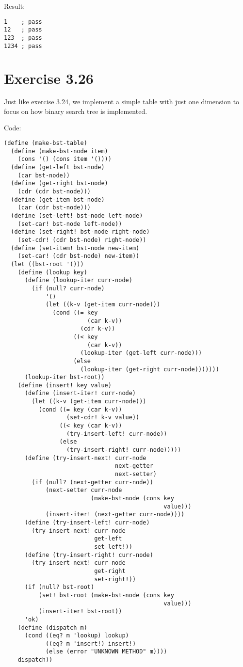 \documentclass[../main.tex]{subfiles}
\begin{document}
Result:

\begin{lstlisting}
1    ; pass
12   ; pass
123  ; pass
1234 ; pass
\end{lstlisting}

\section{Exercise 3.26}

Just like exercise 3.24, we implement a simple table
 with just one dimension to focus on how binary
 search tree is implemented.

Code:

\begin{lstlisting}
(define (make-bst-table)
  (define (make-bst-node item)
    (cons '() (cons item '())))
  (define (get-left bst-node)
    (car bst-node))
  (define (get-right bst-node)
    (cdr (cdr bst-node)))
  (define (get-item bst-node)
    (car (cdr bst-node)))
  (define (set-left! bst-node left-node)
    (set-car! bst-node left-node))
  (define (set-right! bst-node right-node)
    (set-cdr! (cdr bst-node) right-node))
  (define (set-item! bst-node new-item)
    (set-car! (cdr bst-node) new-item))
  (let ((bst-root '()))
    (define (lookup key)
      (define (lookup-iter curr-node)
        (if (null? curr-node)
            '()
            (let ((k-v (get-item curr-node)))
              (cond ((= key
                        (car k-v))
                      (cdr k-v))
                    ((< key
                        (car k-v))
                      (lookup-iter (get-left curr-node)))
                    (else
                      (lookup-iter (get-right curr-node)))))))
      (lookup-iter bst-root))
    (define (insert! key value)
      (define (insert-iter! curr-node)
        (let ((k-v (get-item curr-node)))
          (cond ((= key (car k-v))
                  (set-cdr! k-v value))
                ((< key (car k-v))
                  (try-insert-left! curr-node))
                (else
                  (try-insert-right! curr-node)))))
      (define (try-insert-next! curr-node
                                next-getter
                                next-setter)
        (if (null? (next-getter curr-node))
            (next-setter curr-node
                         (make-bst-node (cons key 
                                              value)))
            (insert-iter! (next-getter curr-node))))
      (define (try-insert-left! curr-node)
        (try-insert-next! curr-node
                          get-left
                          set-left!))
      (define (try-insert-right! curr-node)
        (try-insert-next! curr-node
                          get-right
                          set-right!))
      (if (null? bst-root)
          (set! bst-root (make-bst-node (cons key
                                              value)))
          (insert-iter! bst-root))
      'ok)
    (define (dispatch m)
      (cond ((eq? m 'lookup) lookup)
            ((eq? m 'insert!) insert!)
            (else (error "UNKNOWN METHOD" m))))
    dispatch))
\end{lstlisting}
\end{document}
